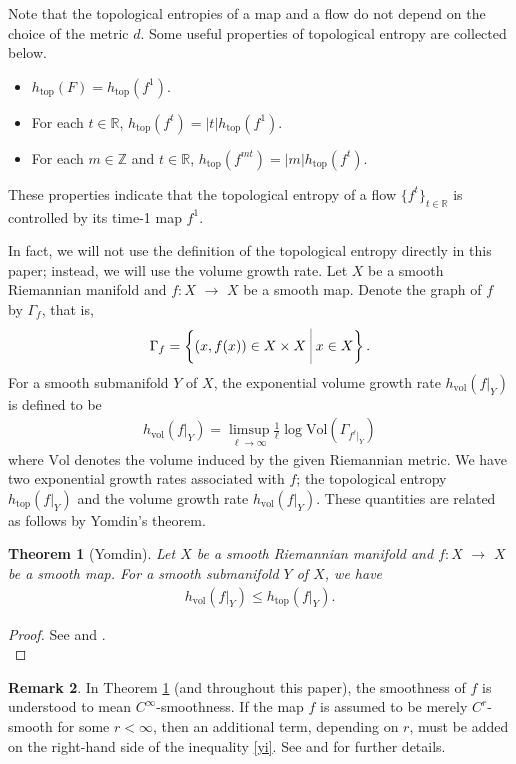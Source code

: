 \documentclass[12pt]{amsart}
\def\bigmid{\ \rule[-3.5mm]{0.1mm}{9mm}\ }
\newtheorem{theorem}{Theorem}[section]
\theoremstyle{definition}
\newtheorem{remark}[theorem]{Remark}
\newcommand{\RR}{{\mathbb R}}
\newcommand{\ZZ}{{\mathbb Z}}
\newcommand{\lr}{{\,\,\longrightarrow\,\,}}
\begin{document}
    Note that the topological entropies of a map and a flow do not depend on the choice of the metric $d$. Some useful properties of topological entropy are collected below.\vspace{0.2cm}
    \begin{itemize}
        \item $h_{\textrm{top}}(F) = h_{\textrm{top}}(f^1)$.\vspace{0.2cm}
        \item For each $t\in \RR$, $h_{\textrm{top}}(f^t) = |t| h_{\textrm{top}}(f^1)$.\vspace{0.2cm}
        \item For each $m \in \ZZ$ and $t \in \RR$, $h_{\textrm{top}}(f^{mt}) = |m| h_{\textrm{top}}(f^t)$.\vspace{0.2cm}
        \end{itemize}
These properties indicate that the topological entropy of a flow $\{f^t\}_{t \in \RR}$ is controlled by its time-1 map $f^1$.

\vspace{0.2cm}

In fact, we will not use the definition of the topological entropy directly in this paper; instead, we will use the volume growth rate. Let $X$ be a smooth Riemannian manifold and $f : X \lr X$ be a smooth map. Denote the graph of $f$ by $\Gamma_f$, that is,
\begin{align*}
    \Gamma_f = \left\{(x,f(x))\in X \times X\bigmid x\in X\right\}.
\end{align*}
For a smooth submanifold $Y$ of $X$, the exponential volume growth rate $h_{\textrm{vol}}(f|_Y)$ is defined to be
\begin{align*}
   h_{\textrm{vol}}(f|_Y) = \limsup_{\ell \to \infty} \frac{1}{\ell} \log  \textrm{Vol}\left(\Gamma_{f^\ell|_Y} \right)
\end{align*}
  where $\textrm{Vol}$ denotes the volume induced by the given Riemannian metric. We have two exponential growth rates associated with $f$; the topological entropy $h_{\textrm{top}}(f|_Y)$ and the volume growth rate $h_{\textrm{vol}}(f|_Y)$. These quantities are related as follows by Yomdin's theorem.
  \begin{theorem}[Yomdin]\label{y}
      Let $X$ be a smooth Riemannian manifold and $f : X \lr X$ be a smooth map. For a smooth submanifold $Y$ of $X$, we have
      \begin{align}\label{yi}
          h_{\textrm{vol}}(f|_Y) \leq h_{\textrm{top}}(f|_Y).
      \end{align}
    \end{theorem}
    \begin{proof}
        See \cite{g} and \cite{y}.\\
    \end{proof}
\begin{remark}
    In Theorem \ref{y} (and throughout this paper), the smoothness of $f$ is understood to mean $C^\infty$-smoothness. If the map $f$ is assumed to be merely $C^r$-smooth for some $r< \infty$, then an additional term, depending on $r$, must be added on the right-hand side of the inequality \eqref{yi}. See \cite{g} and \cite{y} for further details.
\end{remark}    
\vspace{0.2cm}  
\end{document}

